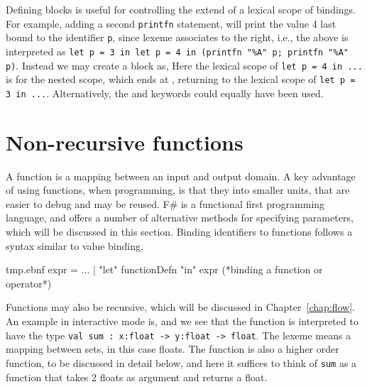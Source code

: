 Defining blocks is useful for controlling the extend of a lexical scope of bindings. For example, adding a second \lstinline!printfn! statement,
%
%
will print the value 4 last bound to the identifier \lstinline!p!, since lexeme \lexeme{;} associates to the right, i.e., the above is interpreted as \lstinline!let p = 3 in let p = 4 in (printfn "%A" p; printfn "%A" p)!. Instead we may create a block as,
%
%
Here the lexical scope of \lstinline!let p = 4 in ...! is for the nested scope, which ends at \lexeme{)}, returning to the lexical scope of \lstinline!let p = 3 in ...!. Alternatively, the  and  keywords could equally have been used.


\section{Non-recursive functions}
\label{sec:functions}
A function is a mapping between an input and output domain. A key advantage of using functions, when programming, is that they  into smaller units, that are easier to debug and may be reused. F\# is a functional first programming language, and offers a number of alternative methods for specifying parameters, which will be discussed in this section. Binding identifiers to functions follows a syntax similar to value binding,
%
\begin{verbatimwrite}{tmp.ebnf}
expr = ...
  | "let" functionDefn "in" expr (*binding a function or operator*)
\end{verbatimwrite}
%
Functions may also be recursive, which will be discussed in Chapter~\ref{chap:flow}. An example in interactive mode is,
%
%
and we see that the function is interpreted to have the type \lstinline!val sum : x:float -> y:float -> float!. The \lexeme{->} lexeme means a mapping between sets, in this case floats. The function is also a higher order function, to be discussed in detail below, and here it suffices to think of \lstinline!sum! as a function that takes 2 floats as argument and returns a float.

